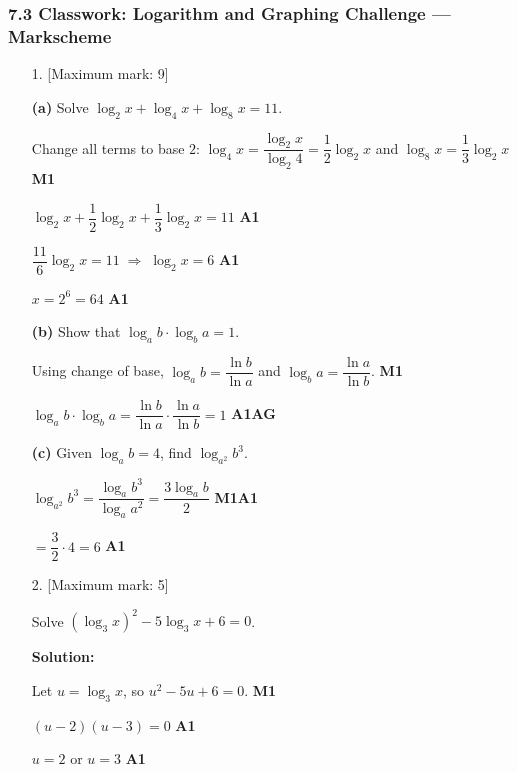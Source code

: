 \documentclass[12pt, twoside]{article}
\begin{document}
\subsubsection*{7.3 Classwork: Logarithm and Graphing Challenge --- Markscheme}

\begin{enumerate}[itemsep=0.3cm]

\item[1.] [Maximum mark: 9]

\textbf{(a)} Solve $\log_2 x + \log_4 x + \log_8 x = 11$.

Change all terms to base $2$:
$\log_4 x = \dfrac{\log_2 x}{\log_2 4} = \dfrac{1}{2}\log_2 x$ \;and\;
$\log_8 x = \dfrac{1}{3}\log_2 x$ \hfill \textbf{M1}

$\log_2 x + \dfrac{1}{2}\log_2 x + \dfrac{1}{3}\log_2 x = 11$ \hfill \textbf{A1}

$\dfrac{11}{6}\log_2 x = 11 \;\Rightarrow\; \log_2 x = 6$ \hfill \textbf{A1}

$x = 2^{6} = 64$ \hfill \textbf{A1}

\medskip

\textbf{(b)} Show that $\log_a b \cdot \log_b a = 1$.

Using change of base, $\log_a b = \dfrac{\ln b}{\ln a}$ and
$\log_b a = \dfrac{\ln a}{\ln b}$. \hfill \textbf{M1}

$\log_a b \cdot \log_b a
= \dfrac{\ln b}{\ln a} \cdot \dfrac{\ln a}{\ln b} = 1$ \hfill \textbf{A1\;AG}

\medskip

\textbf{(c)} Given $\log_a b = 4$, find $\log_{a^2} b^3$.

$\log_{a^2} b^3 = \dfrac{\log_a b^3}{\log_a a^2}
= \dfrac{3 \log_a b}{2}$ \hfill \textbf{M1\;A1}

$= \dfrac{3}{2}\cdot 4 = 6$ \hfill \textbf{A1}

\newpage

\item[2.] [Maximum mark: 5]

Solve $(\log_3 x)^2 - 5 \log_3 x + 6 = 0$.

\textbf{Solution:}

Let $u = \log_3 x$, so $u^2 - 5u + 6 = 0$. \hfill \textbf{M1}

$(u - 2)(u - 3) = 0$ \hfill \textbf{A1}

$u = 2$ \;\;or\;\; $u = 3$ \hfill \textbf{A1}


\end{enumerate}
\end{document}
